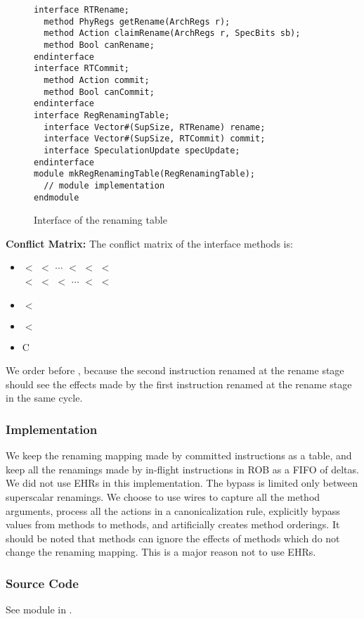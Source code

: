 \begin{figure}
\begin{lstlisting}[caption={}]
interface RTRename;
  method PhyRegs getRename(ArchRegs r);
  method Action claimRename(ArchRegs r, SpecBits sb);
  method Bool canRename;
endinterface
interface RTCommit;
  method Action commit;
  method Bool canCommit;
endinterface
interface RegRenamingTable;
  interface Vector#(SupSize, RTRename) rename;
  interface Vector#(SupSize, RTCommit) commit;
  interface SpeculationUpdate specUpdate;
endinterface
module mkRegRenamingTable(RegRenamingTable);
  // module implementation
endmodule
\end{lstlisting}
\caption{Interface of the renaming table}\label{fig:rt-ifc}
\end{figure}

\noindent\textbf{Conflict Matrix:}
The conflict matrix of the interface methods is:
\begin{itemize}
    \item {} $<$  $<$ $\cdots$ $<$  $<$  $<$ \\  $<$  $<$  $<$ $\cdots$ $<$  $<$ 
    \item {} $<$ 
    \item {} $<$ 
    \item {} C 
\end{itemize}
We order  before , because the second instruction renamed at the rename stage should see the effects made by the first instruction renamed at the rename stage in the same cycle.

\subsubsection{Implementation}
We keep the renaming mapping made by committed instructions as a table, and keep all the renamings made by in-flight instructions in ROB as a FIFO of deltas.
We did not use EHRs in this implementation.
The bypass is limited only between superscalar renamings.
We choose to use wires to capture all the method arguments, process all the actions in a canonicalization rule, explicitly bypass values from  methods to  methods, and artificially creates method orderings.
It should be noted that  methods can ignore the effects of  methods which do not change the renaming mapping.
This is a major reason not to use EHRs.

\subsubsection{Source Code}
See module  in .
